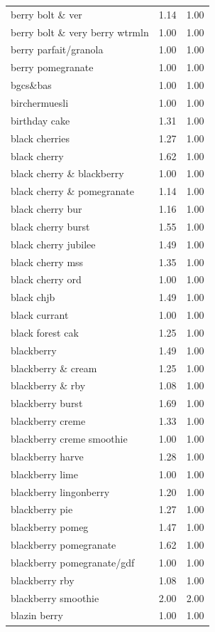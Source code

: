 \begin{table}
\begin{tabular}{lrr}
berry bolt \& ver & 1.14 & 1.00 \\
berry bolt \& very berry wtrmln & 1.00 & 1.00 \\
berry parfait/granola & 1.00 & 1.00 \\
berry pomegranate & 1.00 & 1.00 \\
bgcs\&bas & 1.00 & 1.00 \\
birchermuesli & 1.00 & 1.00 \\
birthday cake & 1.31 & 1.00 \\
black cherries & 1.27 & 1.00 \\
black cherry & 1.62 & 1.00 \\
black cherry \& blackberry & 1.00 & 1.00 \\
black cherry \& pomegranate & 1.14 & 1.00 \\
black cherry bur & 1.16 & 1.00 \\
black cherry burst & 1.55 & 1.00 \\
black cherry jubilee & 1.49 & 1.00 \\
black cherry mss & 1.35 & 1.00 \\
black cherry ord & 1.00 & 1.00 \\
black chjb & 1.49 & 1.00 \\
black currant & 1.00 & 1.00 \\
black forest cak & 1.25 & 1.00 \\
blackberry & 1.49 & 1.00 \\
blackberry \& cream & 1.25 & 1.00 \\
blackberry \& rby & 1.08 & 1.00 \\
blackberry burst & 1.69 & 1.00 \\
blackberry creme & 1.33 & 1.00 \\
blackberry creme smoothie & 1.00 & 1.00 \\
blackberry harve & 1.28 & 1.00 \\
blackberry lime & 1.00 & 1.00 \\
blackberry lingonberry & 1.20 & 1.00 \\
blackberry pie & 1.27 & 1.00 \\
blackberry pomeg & 1.47 & 1.00 \\
blackberry pomegranate & 1.62 & 1.00 \\
blackberry pomegranate/gdf & 1.00 & 1.00 \\
blackberry rby & 1.08 & 1.00 \\
blackberry smoothie & 2.00 & 2.00 \\
blazin berry & 1.00 & 1.00 \\

\end{tabular}
\end{table}

